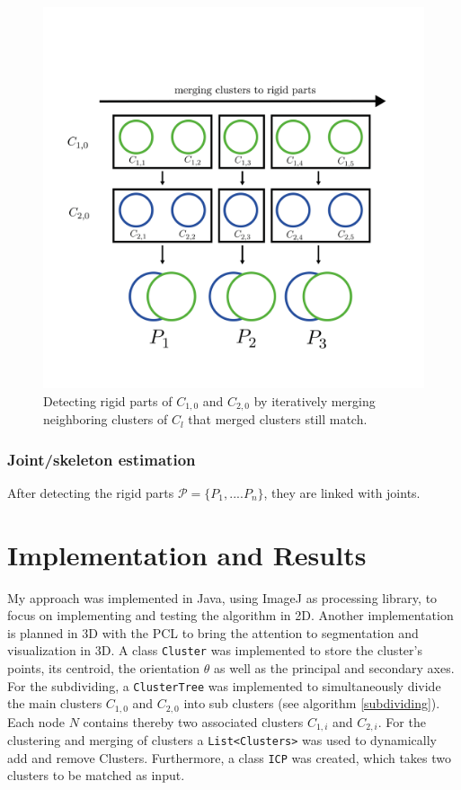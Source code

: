 \documentclass[notitlepage,english]{hgbreport}
\begin{document}
	\begin{figure}
		\centering
		\includegraphics[width=0.7\linewidth]{ClusterChain}
		\caption{Detecting rigid parts of $C_{1,0}$ and $C_{2,0}$ by iteratively merging neighboring clusters of $C_l$ that merged clusters still match.}
		\label{fig:clusterChain}
	\end{figure}
	
	\subsection{Joint/skeleton estimation}
	
	After detecting the rigid parts $\mathcal{P} =  \{ {P_1,....P_n}\}$, they are linked with joints.
	
	\chapter{Implementation and Results}
	
	My approach was implemented in Java, using ImageJ as processing library, to focus on implementing and testing the algorithm in 2D. Another implementation is planned in 3D with the PCL to bring the attention to segmentation and visualization in 3D. A class \texttt{Cluster} was implemented to store the cluster's points, its centroid, the orientation $\theta$ as well as the principal and secondary axes. For the subdividing, a \texttt{ClusterTree} was implemented to simultaneously divide the main clusters $C_{1,0}$ and $C_{2,0}$ into sub clusters (see algorithm \ref{subdividing}). Each node $N$ contains thereby two associated clusters $C_{1,i}$ and $C_{2,i}$. For the clustering and merging of clusters a \texttt{List<Clusters>} was used to dynamically add and remove Clusters. Furthermore, a class \texttt{ICP} was created, which takes two clusters to be matched as input.
	
\end{document}
